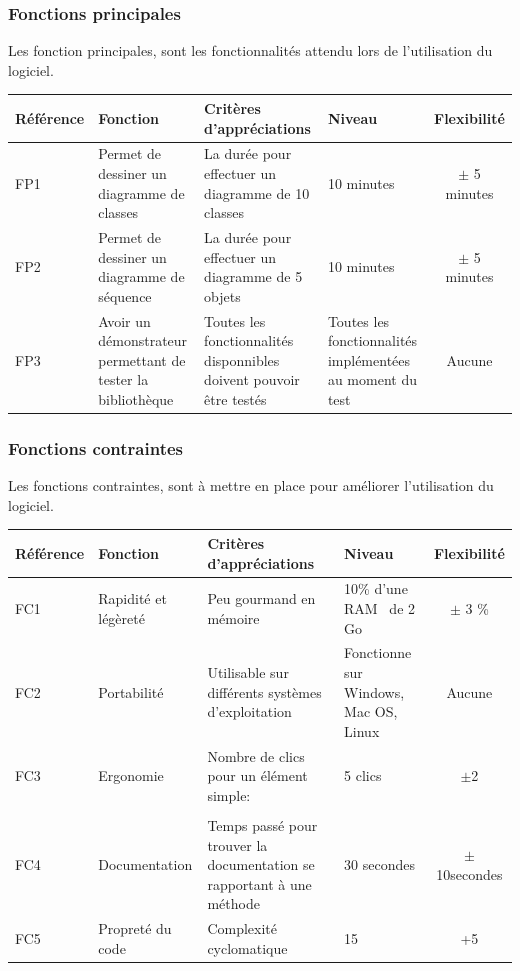 \documentclass[12pt,a4paper,openany]{article}
\begin{document}
	\subsubsection{Fonctions principales}
	Les fonction principales, sont les fonctionnalités attendu lors de l'utilisation du logiciel.\\ 
	\begin{tabular}{|p{2cm}|p{3cm}|p{5cm}|p{3cm}|c|}
		\hline
		\textbf{Référence}& \textbf{Fonction} & \textbf{Critères d'appréciations} & \textbf{Niveau} & \textbf{Flexibilité} \\
		\hline
			FP1 & Permet de dessiner un diagramme de classes & La durée pour effectuer un diagramme de 10 classes & 10 minutes & $\pm$ 5 minutes\\
		\hline
			FP2 & Permet de dessiner un diagramme de séquence & La durée pour effectuer un diagramme de 5 objets & 10 minutes & $\pm$ 5 minutes\\
		\hline
			FP3 & Avoir un démonstrateur permettant de tester la bibliothèque & Toutes les fonctionnalités disponnibles doivent pouvoir être testés & Toutes les fonctionnalités implémentées au moment du test & Aucune \\
		\hline
	\end{tabular}
	\subsubsection{Fonctions contraintes}
	Les fonctions contraintes, sont à mettre en place pour améliorer l'utilisation du logiciel.\\
	\begin{tabular}{|p{2cm}|p{3.5cm}|p{5cm}|p{3cm}|c|}
		\hline
		\textbf{Référence}& \textbf{Fonction} & \textbf{Critères d'appréciations} & \textbf{Niveau} & \textbf{Flexibilité} \\
		\hline
		FC1 & Rapidité et légèreté & Peu gourmand en mémoire & 10\% d'une RAM \footnotemark~de 2 Go & $\pm$ 3 \%\\
		\hline
			FC2 & Portabilité & Utilisable sur différents systèmes d'exploitation & Fonctionne sur Windows, Mac OS, Linux & Aucune \\
		\hline
		FC3 & Ergonomie & Nombre de clics pour un élément simple: & 5 clics &$\pm$2\\& &\begin{center}\end{center}&  & \\
		\hline
			FC4 & Documentation & Temps passé pour trouver la documentation se rapportant à une méthode &30 secondes& $\pm$10secondes \\ 
		\hline
			FC5 & Propreté du code & Complexité cyclomatique& 15 & +5\\ 
		\hline
	\end{tabular}
\end{document}
